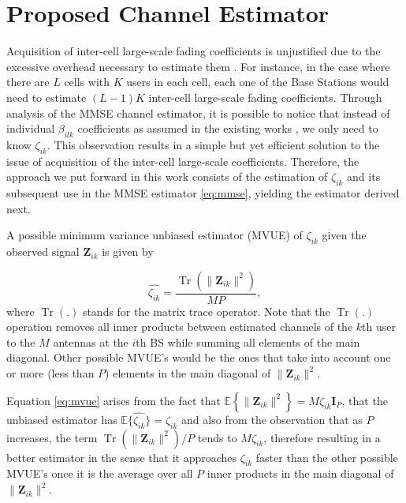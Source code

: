 \documentclass[journal,12pt,onecolumn]{IEEEtran}
\DeclareMathOperator{\Tr}{Tr}
\begin{document}
\section{Proposed Channel Estimator}

Acquisition of inter-cell large-scale fading coefficients is unjustified due to the excessive overhead necessary to estimate them \cite{fengChen:largeScale}. For instance, in the case where there are $L$ cells with $K$ users in each cell, each one of the Base Stations would need to estimate $(L-1)K$ inter-cell large-scale fading coefficients. Through analysis of the MMSE channel estimator, it is possible to notice that instead of individual ${\beta_{ilk}}$ coefficients as assumed in the existing works \cite{marzetta:noncooperative, marzetta:pilotContamination, Debbah:howmanyantennas, Marzetta:finitedimensionalchannels, Ashikhmi:interference_reduction, Bjornson:LowComplexityPolynomial, Gesbert:coordinated}, we only need to know $\zeta_{ik}$. This observation results in a simple but yet efficient solution to the issue of acquisition of the inter-cell large-scale coefficients. Therefore, the approach we put forward in this work consists of the estimation of $\zeta_{ik}$ and its subsequent use in the MMSE estimator \eqref{eq:mmse}, yielding the estimator derived next.

A possible minimum variance unbiased estimator (MVUE) of $\zeta_{ik}$ given the observed signal $\textbf{Z}_{ik}$ is given by \cite{kay:estimationbook}

\begin{equation}\label{eq:mvue}
\hat{\zeta_{ik}} =  \frac{ \Tr \left(  \lVert \textbf{Z}_{ik} \rVert^{2} \right) }{MP},
\end{equation}
where $\Tr(.)$ stands for the matrix trace operator. Note that the $\Tr(.)$ operation removes all inner products between estimated channels of the $k$th user to the $M$ antennas at the $i$th BS while summing all elements of the main diagonal. Other possible MVUE's would be the ones that take into account one or more (less than $P$) elements in the main diagonal of $\lVert \textbf{Z}_{ik} \rVert^{2}$. 

Equation \eqref{eq:mvue} arises from the fact that $\mathbb{E} \left\lbrace \lVert \textbf{Z}_{ik} \rVert^{2} \right\rbrace = M \zeta_{ik} \textbf{I}_{P}$, that the unbiased estimator has $\mathbb{E} \{ \hat{\zeta_{ik}} \} =\zeta_{ik}$ and also from the observation that as $P$ increases, the term $ \Tr \left(  \lVert \textbf{Z}_{ik} \rVert^{2} \right) / P$ tends to $M\zeta_{ik}$, therefore resulting in a better estimator in the sense that it approaches $\zeta_{ik}$ faster than the other possible MVUE's once it is the average over all $P$ inner products in the main diagonal of $\lVert \textbf{Z}_{ik} \rVert^{2}$.
\end{document}
